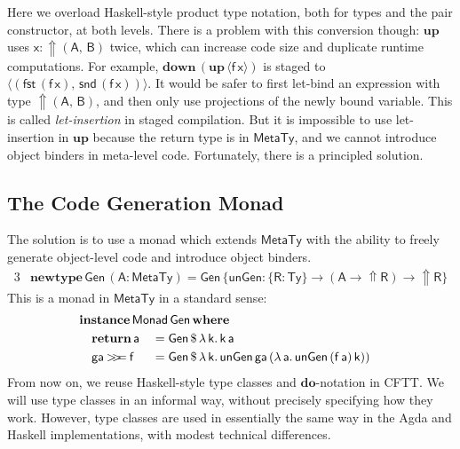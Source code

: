 \documentclass[acmsmall,screen,review,anonymous]{acmart}
\newcommand{\mit}[1]{{\mathsf{#1}}}
\newcommand{\msf}[1]{{\mathsf{#1}}}
\newcommand{\mbf}[1]{{\mathbf{#1}}}
\newcommand{\bs}[1]{\boldsymbol{#1}}
\newcommand{\ind}{\hspace{1em}}
\newcommand{\return}{\mbf{return}\,}
\newcommand{\lam}{\lambda\,}
\newcommand{\where}{\mbf{where}}
\newcommand{\vk}{\mathsf{k}}
\newcommand{\vA}{\mathsf{A}}
\newcommand{\vB}{\mathsf{B}}
\newcommand{\vR}{\mathsf{R}}
\newcommand{\va}{\mathsf{a}}
\newcommand{\vx}{\mathsf{x}}
\newcommand{\vf}{\mathsf{f}}
\newcommand{\Monad}{\msf{Monad}}
\newcommand{\Up}{{\Uparrow}}
\newcommand{\ql}{{\bs{\langle}}}
\newcommand{\qr}{{\bs{\rangle}}}
\newcommand{\bind}{\mathbin{>\!\!>\mkern-6.7mu=}}
\newcommand{\MTy}{\msf{MetaTy}}
\newcommand{\Ty}{\msf{Ty}}
\newcommand{\fst}{\msf{fst}}
\newcommand{\snd}{\msf{snd}}
\theoremstyle{remark}
\newcommand{\mup}{\mbf{up}}
\newcommand{\mdown}{\mbf{down}}
\newcommand{\instance}{\mbf{instance}\,}
\newcommand{\Gen}{\msf{Gen}}
\newcommand{\unGen}{\mit{unGen}}
\newcommand{\newtype}{\mbf{newtype}\,}
\newcommand{\dlr}{\,\$\,}
\begin{document}
Here we overload Haskell-style product type notation, both for types and the
pair constructor, at both levels. There is a problem with this conversion
though: $\mup$ uses $\vx : \Up(\vA,\,\vB)$ twice, which can increase code size
and duplicate runtime computations. For example, $\mdown\,({\mup\,\ql \vf\,\vx
  \qr})$ is staged to $\ql (\fst\,(\vf\,\vx),\,\snd\,(\vf\,\vx)) \qr$. It would
be safer to first let-bind an expression with type $\Up(\vA,\,\vB)$, and then
only use projections of the newly bound variable. This is called
\emph{let-insertion} in staged compilation. But it is impossible to use
let-insertion in $\mup$ because the return type is in $\MTy$, and we cannot
introduce object binders in meta-level code.  Fortunately, there is a principled
solution.

\subsection{The Code Generation Monad}\label{sec:the-code-generation-monad}

The solution is to use a monad which extends $\MTy$ with the ability to
freely generate object-level code and introduce object binders.
\begin{alignat*}{3}
  & \newtype \Gen\,(\vA : \MTy) = \Gen\,\{\unGen : \{\vR : \Ty\} \to (\vA \to \Up \vR) \to \Up \vR\}
\end{alignat*}
This is a monad in $\MTy$ in a standard sense:
\begin{alignat*}{3}
  &\mathrlap{\instance \Monad\,\Gen\,\where}\\
  &\ind \return \va        &&= \Gen \dlr \lam \vk.\,\vk\,\va\\
  &\ind \mit{ga} \bind \vf &&= \Gen \dlr \lam \vk.\,\unGen\,\mit{ga}\,(\lam \va.\,\unGen\,(\vf\,\va)\,\vk))
\end{alignat*}
From now on, we reuse Haskell-style type classes and $\mbf{do}$-notation in
CFTT. We will use type classes in an informal way, without precisely specifying
how they work. However, type classes are used in essentially the same way in the
Agda and Haskell implementations, with modest technical differences.
\end{document}
